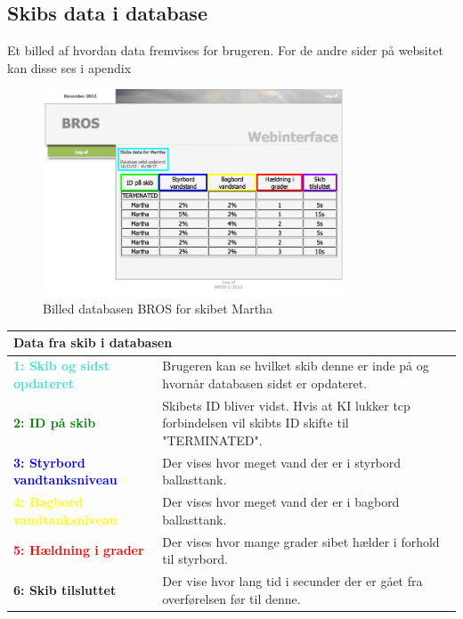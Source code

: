 \subsection*{Skibs data i database}
Et billed af hvordan data fremvises for brugeren. For de andre sider på websitet kan disse ses i apendix
\begin{figure}[H]
	\centering
	\includegraphics[width=0.8\textwidth]{billeder/web_database}
	\caption{Billed databasen BROS for skibet Martha}
	\label{fig:web_database}
\end{figure}
\begin{table}[H]
\begin{tabular}{l p{12.5cm}}

\multicolumn{2}{l}{Data fra skib i databasen } \\
\hline
\textcolor{Turquoise}{\textbf{1: Skib og sidst opdateret}}
&Brugeren kan se hvilket skib denne er inde på og hvornår databasen sidst er opdateret.\\
\textcolor{green}{\textbf{2: ID på skib}}
&Skibets ID bliver vidst. Hvis at KI lukker tcp forbindelsen vil skibts ID skifte til "TERMINATED".\\
\textcolor{blue}{\textbf{3: Styrbord vandtanksniveau}}
&Der vises hvor meget vand der er i styrbord ballasttank.\\
\textcolor{yellow}{\textbf{4: Bagbord vandtanksniveau}}
&Der vises hvor meget vand der er i bagbord ballasttank.\\
\textcolor{red}{\textbf{5: Hældning i grader}}
&Der vises hvor mange grader sibet hælder i forhold til styrbord.\\
\textcolor{RoyalPurple}{\textbf{6: Skib tilsluttet}}
&Der vise hvor lang tid i secunder der er gået fra overførelsen før til denne.\\
\end{tabular}
\end{table}